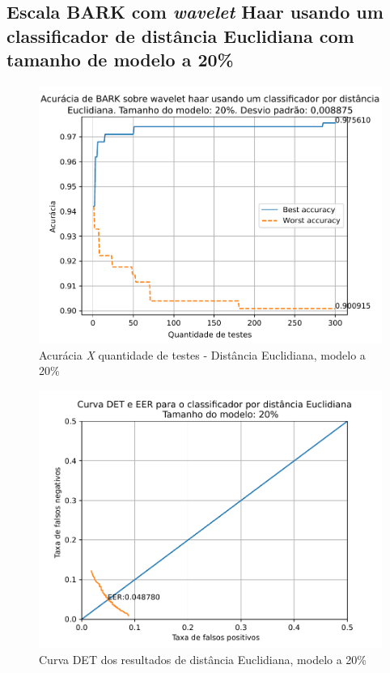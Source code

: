 		\subsection{Escala BARK com \textit{wavelet} Haar usando um classificador de distância Euclidiana com tamanho de modelo a 20\%}
			
			
			\begin{figure}[ht]
				\centering
				\includegraphics[width=\linewidth]{images/results/confusionMatrices/classifier_Euclidian_20}
				\caption{Acurácia \textit{X} quantidade de testes - Distância Euclidiana, modelo a 20\%}
				\label{fig:classifiereuclidian20}
			\end{figure}
		
			\begin{figure}[!ht]
				\centering
				\includegraphics[width=.9\linewidth]{images/results/det/DET_for_classifier_Euclidian_20}
				\caption{Curva DET dos resultados de distância Euclidiana, modelo a 20\%}
				\label{fig:detforclassifiereuclidian20}
			\end{figure}

